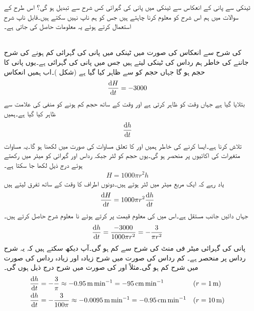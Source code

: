 ٹینکی سے  پانی کے انعکاس سے ٹینکی میں پانی کی گہرائی کس شرح سے تبدیل ہو گی؟ اس طرح کے سوالات میں ہم اس شرح کو معلوم کرنا چاہتے  ہیں جس کو ہم ناپ نہیں سکتے ہیں۔قابل ناپ شرح استعمال کرتے ہوئے یہ معلومات حاصل کی جاتی ہے۔

\\
 کی شرح سے انعکاس کی صورت میں ٹینکی میں پانی کی گہرائی کم ہونے کی شرح جاننے کی خاطر ہم رداس  کی ٹینکی لیتے ہیں جس میں پانی کی گہرائی  ہے۔یوں پانی کا حجم  ہو گا جہاں حجم کو  سے ظاہر کیا گیا ہے (شکل )۔اب ہمیں انعکاس
\begin{align*}
\frac{\dif H}{\dif t}=-3000
\end{align*}
بتلایا گیا ہے جہاں  وقت کو ظاہر کرتی ہے اور وقت کے ساتھ حجم کم ہونے کو منفی کی علامت سے ظاہر کیا گیا ہے۔ہمیں
\begin{align*}
\frac{\dif h}{\dif t}
\end{align*}
تلاش کرنا ہے۔ایسا کرنے کی خاطر ہمیں  اور  کا تعلق مساوات کی صورت میں لکھنا ہو گا۔یہ مساوات متغیرات کی اکائیوں پر منحصر ہو گی۔یوں حجم کو لٹر جبکہ رداس اور گہرائی کو میٹر میں رکھتے ہوئے درج ذیل لکھا جا سکتا ہے۔
\begin{align*}
H=1000\pi r^2h
\end{align*}
یاد رہے کہ ایک  مربع میٹر میں  لٹر ہوتے ہیں۔دونوں اطراف کا وقت کے ساتھ تفرق لیتے ہیں
\begin{align*}
\frac{\dif H}{\dif t}=1000\pi r^2\frac{\dif h}{\dif t}
\end{align*}
جہاں دائیں جانب  مستقل ہے۔اس میں  کی معلوم قیمت پر کرتے ہوئے نا معلوم شرح  حاصل کرتے ہیں۔
\begin{align*}
\frac{\dif h}{\dif t}=\frac{-3000}{1000\pi r^2}=-\frac{3}{\pi r^2}
\end{align*}
پانی کی گہرائی  میٹر فی منٹ کی شرح سے کم ہو گی۔آپ دیکھ سکتے ہیں کہ یہ شرح رداس پر منحصر ہے۔ کم رداس کی صورت میں شرح زیادہ اور زیادہ رداس کی صورت میں شرح کم ہو گی۔مثلاً  اور  کی صورت میں شرح درج ذیل ہوں گی۔
\begin{align*}
\frac{\dif h}{\dif t}&=-\frac{3}{\pi}\approx \SI{-0.95}{\meter\per\minute}=\SI{-95}{\centi\meter\per\minute}&&(r=\SI{1}{\meter})\\
\frac{\dif h}{\dif t}&=-\frac{3}{100\pi}\approx \SI{-0.0095}{\meter\per\minute}=\SI{-0.95}{\centi\meter\per\minute}&&(r=\SI{10}{\meter})
\end{align*}
